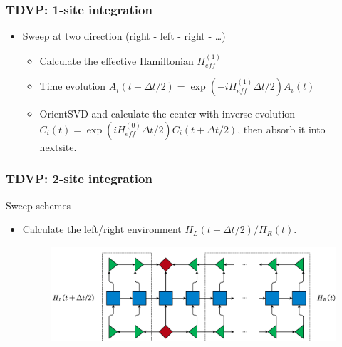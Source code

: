 \documentclass{beamer}
\begin{document}
\begin{frame}
	\frametitle{TDVP: 1-site integration}
	\begin{itemize}
		\item Sweep at two direction (right - left - right - \dots)
		\begin{itemize}
			\item Calculate the effective Hamiltonian $H_{eff}^{(1)}$
			\item Time evolution $A_i(t+\Delta t/2) = \exp(-iH_{eff}^{(1)}\Delta t / 2)A_i(t)$ 
			\item OrientSVD and calculate the center with inverse evolution $C_i(t) = \exp(iH_{eff}^{(0)}\Delta t /2) C_i(t+\Delta t/2)$, then absorb it into nextsite.
			\setcounter{subfigure}{0}
			\begin{figure}[H]
				\centering
				\subfigbottomskip=2pt
				\subfigcapskip=-5pt
			\end{figure}
		\end{itemize}
	\end{itemize}
\end{frame}

\begin{frame}
	\frametitle{TDVP: 2-site integration}
	Sweep schemes
	\begin{itemize}
		\item Calculate the left/right environment $H_L(t+\Delta t/2)/H_R(t)$.
		\begin{figure}[H]
			\includegraphics[width=0.8 \linewidth]{images/LRenv2 t.pdf}
		\end{figure}
	\end{itemize}
\end{frame}
\end{document}

